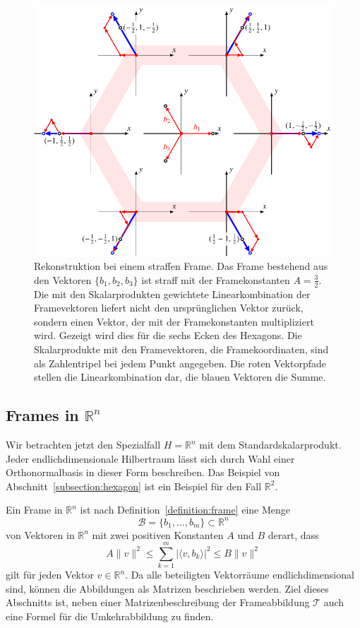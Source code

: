 \begin{figure}
\centering
\includegraphics{chapters/1-geometrie/images/hexagon3.pdf}
\caption{Rekonstruktion bei einem straffen Frame.
Das Frame bestehend aus den Vektoren $\{b_1,b_2,b_3\}$ ist straff
mit der Framekonstanten $A=\frac32$.
Die mit den Skalarprodukten gewichtete Linearkombination der
Framevektoren liefert nicht den ursprünglichen Vektor zurück, sondern
einen Vektor, der mit der Framekonstanten multipliziert wird.
Gezeigt wird dies für die sechs Ecken des Hexagons.
Die Skalarprodukte mit den Framevektoren, die Framekoordinaten, sind
als Zahlentripel bei jedem Punkt angegeben.
Die roten Vektorpfade stellen die Linearkombination dar, die blauen
Vektoren die Summe.
\label{geometrie:hexagon:rekonstruktion}}
\end{figure}

%
%
\subsection{Frames in $\mathbb R^n$
\label{subsetion:skript:frames:framesinrn}}
Wir betrachten jetzt den Spezialfall $H=\mathbb{R}^n$ mit dem
Standardskalarprodukt.
Jeder endlichdimensionale Hilbertraum lässt sich durch Wahl einer
Orthonormalbasis in dieser Form beschreiben.
Das Beispiel von Abschnitt~\ref{subsection:hexagon} ist ein Beispiel für
den Fall $\mathbb R^2$.

Ein Frame in $\mathbb R^n$ ist nach Definition~\ref{definition:frame}
eine Menge 
\[
\mathcal{B}
=
\{b_1,\dots,b_m\}
\subset
\mathbb R^n
\]
von Vektoren in $\mathbb R^n$ mit zwei positiven Konstanten $A$ und $B$
derart, dass
\[
A\|v\|^2
\le
\sum_{k=1}^m |\langle v,b_k\rangle|^2
\le
B\|v\|^2
\]
gilt für jeden Vektor $v\in\mathbb R^n$.
Da alle beteiligten Vektorräume endlichdimensional sind, können
die Abbildungen als Matrizen beschrieben werden.
Ziel dieses Abschnitts ist, neben einer Matrizenbeschreibung
der Frameabbildung $\mathcal{T}$ auch eine Formel für die
Umkehrabbildung zu finden.

